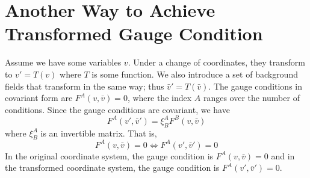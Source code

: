 \section{Another Way to Achieve Transformed Gauge Condition}\label{transformgauge}
Assume we have some variables $v$. Under a change of coordinates, they transform to $v' = T\left(v\right)$ where $T$ is some function. We also introduce a 
set of background fields that transform in the same way; thus $\bar v' = T\left(\bar v\right)$. The gauge conditions in covariant form are $F^A\left(v,\bar v\right) = 0$, 
where the index $A$ ranges over the number of conditions. Since the gauge conditions are covariant, we have 
\begin{equation}
	F^A\left(v',\bar v'\right) = \xi^A_B F^B\left(v,\bar v\right)
\end{equation}
where $\xi^A_B$ is an invertible matrix. That is, 
\begin{equation}\label{covariant equivalence}
	 F^A\left(v,\bar v\right) = 0 \Longleftrightarrow F^A\left(v',\bar v'\right) = 0
\end{equation}
In the original coordinate system, the gauge condition is $F^A\left(v,\bar v\right) = 0$ and in the transformed coordinate system, the 
gauge condition is $F^A\left(v',\bar v'\right) = 0$.

